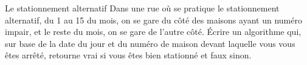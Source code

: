 	\begin{Exercice}{Le stationnement alternatif}
		Dans une rue où se pratique le stationnement alternatif, 
		du 1 au 15 du mois, on se gare du côté des maisons ayant un numéro impair, 
		et le reste du mois, on se gare de l’autre côté. 
		Écrire un algorithme qui, sur base de la date du jour et du numéro de maison
		devant laquelle vous vous êtes arrêté, 
		retourne vrai si vous êtes bien stationné et faux sinon.
	\end{Exercice}

	
